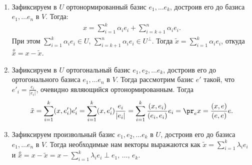 \begin{algorithm}~
    \begin{enumerate}
        \item Зафиксируем в $U$ ортонормированный базис $e_1, \dots e_k$, достроив его до базиса 
        $e_1, \dots e_n$ в $V$. Тогда:
        \begin{gather*}
            x = \sum_{i=1}^{k} \alpha_i e_i + \sum_{i=k+1}^{n}\alpha_i e_i.
        \end{gather*}
        При этом $\displaystyle\sum_{i=1}^{k} \alpha_i e_i \in U$, 
        $\displaystyle \sum_{i=k+1}^{n}\alpha_i e_i \in U^{\perp}$. Тогда 
        $\tilde{x} = \displaystyle\sum_{i=1}^{k}\alpha_i e_i$, откуда $\stackrel{o}{x} = x - \tilde{x}$.
        \item Зафиксируем в $U$ ортогональный базис $e_1, e_2, \dots e_k$, достроив его до 
        ортогонального базиса $e_1, \dots e_n$ в $V$. Тогда рассмотрим базис $e'$ такой, что
        $e'_i = \frac{e_i}{|e_i|}$, очевидно являющийся ортонормированным. Тогда 
        \begin{gather*}
            \tilde{x} = \displaystyle\sum_{i=1}^{k} (x, e'_i)e'_i = \displaystyle\sum_{i=1}^{k} (x, e'_i) 
            \frac{e_i}{|e_i|} = \displaystyle\sum_{i=1}^{k} \frac{(x, e_i)}{(e_i, e_i)} e_i = 
            \pr_e x = \frac{(x, e)}{(e, e)} e.
        \end{gather*}
        \item Зафиксируем произвольный базис $e_1, e_2, \dots e_k$ в $U$, достроив его до базиса
        $e_1, \dots e_n$ в $V$.
        Тогда необходимые нам векторы выражаются как $\tilde{x} = \displaystyle\sum_{i=1}^{k} \lambda_i e_i$ и $\stackrel{o}{x} = x - \tilde{x} = 
        x - \displaystyle\sum_{i=1}^{k} \lambda_i e_i \perp e_1, \, \dots , \, e_k$.
        

\end{enumerate}
\end{algorithm}
